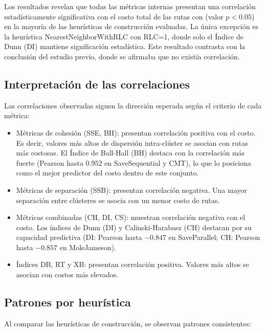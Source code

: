 Los resultados revelan que todas las m\'etricas internas presentan una correlaci\'on estad\'isticamente significativa con el costo total de las rutas con (valor $p < 0.05$) en la mayor\'ia de las heur\'isticas de construcci\'on evaluadas. La \'unica excepci\'on es la heur\'istica NearestNeighborWithRLC con RLC=1, donde solo el \'Indice de Dunn (DI) mantiene significaci\'on estad\'istica. Este resultado contrasta con la conclusi\'on del estudio previo, donde se afirmaba que no exist\'ia correlaci\'on. 

\subsection*{Interpretaci\'on de las correlaciones}

Las correlaciones observadas siguen la direcci\'on esperada seg\'un el criterio de cada m\'etrica:

\begin{itemize}
  \item M\'etricas de cohesi\'on (SSE, BH): presentan correlaci\'on {positiva} con el costo. Es decir, valores m\'as altos de dispersi\'on intra-cl\'uster se asocian con rutas m\'as costosas. El \'Indice de Ball-Hall (BH) destaca con la correlaci\'on m\'as fuerte (Pearson hasta $0.952$ en SaveSequential y CMT), lo que lo posiciona como el mejor predictor del costo dentro de este conjunto.
  \item M\'etricas de separaci\'on (SSB): presentan correlaci\'on {negativa}. Una mayor separaci\'on entre cl\'usteres se asocia con un menor costo de rutas.
  \item M\'etricas combinadas (CH, DI, CS): muestran correlaci\'on {negativa} con el costo. Los \'indices de Dunn (DI) y Calinski-Harabasz (CH) destacan por su capacidad predictiva (DI: Pearson hasta $-0.847$ en SaveParallel; CH: Pearson hasta $-0.857$ en MoleJameson).
  \item \'Indices DB, RT y XB: presentan correlaci\'on {positiva}. Valores m\'as altos se asocian con costos m\'as elevados.
\end{itemize}

\subsection*{Patrones por heur\'istica}

Al comparar las heur\'isticas de construcci\'on, se observan patrones consistentes:

